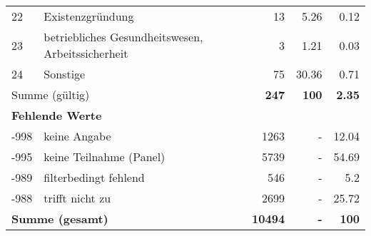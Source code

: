 \begin{longtable}{lXrrr}
        22 & \multicolumn{1}{X}{Existenzgründung} & %
          \num{13} &
          \num[round-mode=places,round-precision=2]{5.26} &
          \num[round-mode=places,round-precision=2]{0.12} \\

        23 & \multicolumn{1}{X}{betriebliches Gesundheitswesen, Arbeitssicherheit} & %
          \num{3} &
          \num[round-mode=places,round-precision=2]{1.21} &
          \num[round-mode=places,round-precision=2]{0.03} \\

        24 & \multicolumn{1}{X}{Sonstige} & %
          \num{75} &
          \num[round-mode=places,round-precision=2]{30.36} &
          \num[round-mode=places,round-precision=2]{0.71} \\

     \midrule
     \multicolumn{2}{l}{Summe (gültig)} &
       \textbf{\num{247}} &
     \textbf{\num{100}} &
       \textbf{\num[round-mode=places,round-precision=2]{2.35}} \\
     \multicolumn{5}{l}{\textbf{Fehlende Werte}}\\
       -998 &
       keine Angabe &
         \num{1263} &
        - &
         \num[round-mode=places,round-precision=2]{12.04} \\
       -995 &
       keine Teilnahme (Panel) &
         \num{5739} &
        - &
         \num[round-mode=places,round-precision=2]{54.69} \\
       -989 &
       filterbedingt fehlend &
         \num{546} &
        - &
         \num[round-mode=places,round-precision=2]{5.2} \\
       -988 &
       trifft nicht zu &
         \num{2699} &
        - &
         \num[round-mode=places,round-precision=2]{25.72} \\
     \midrule
     \multicolumn{2}{l}{\textbf{Summe (gesamt)}} &
          \textbf{\num{10494}} &
        \textbf{-} &
        \textbf{\num{100}} \\
     \bottomrule
     \end{longtable}
     
